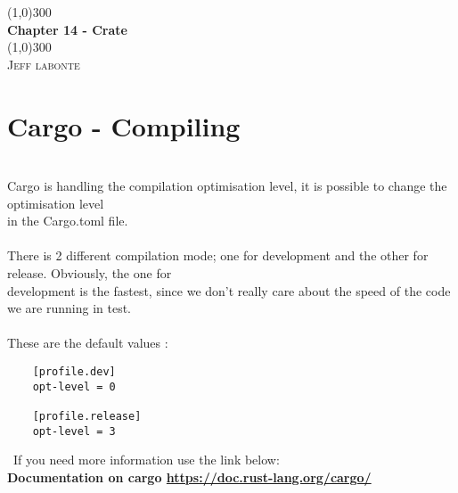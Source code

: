 \documentclass{article}
\begin{document}
  \begin{titlepage}
    \begin{center}
      \line(1,0){300} \\
      [0.25in]
      \huge{\bfseries Chapter 14 - Crate}\\
      [2mm]
      \line(1,0){300}\\
      [1.5cm]
      \textsc{\LARGE Jeff labonte}\\
      [0.75cm]
    \end{center}
  \end{titlepage}
  \section {Cargo - Compiling}
  \ \\[2mm]
  Cargo is handling the compilation optimisation level, it is possible to change the optimisation level \\
  in the Cargo.toml file. \\
  \ \\[2mm]
  There is 2 different compilation mode; one for development and the other for release. Obviously, the one for\\
  development is the fastest, since we don't really care about the speed of the code we are running in test. \\
  \ \\[2mm]
  These are the default values :
  \begin{lstlisting}
    [profile.dev]
    opt-level = 0

    [profile.release]
    opt-level = 3
  \end{lstlisting}
  \
  If you need more information use the link below: \\
  \textbf{Documentation on cargo \url{https://doc.rust-lang.org/cargo/}}
  \ \\[5mm]
  \\
\end{document}
